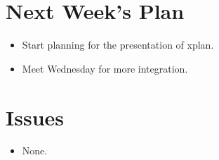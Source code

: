 \section{Next Week's Plan}
\begin{itemize}
	\item Start planning for the presentation of xplan.
	\item Meet Wednesday for more integration.
\end{itemize}

%
%
%
\section{Issues}
\begin{itemize}
	\item None.
\end{itemize}



